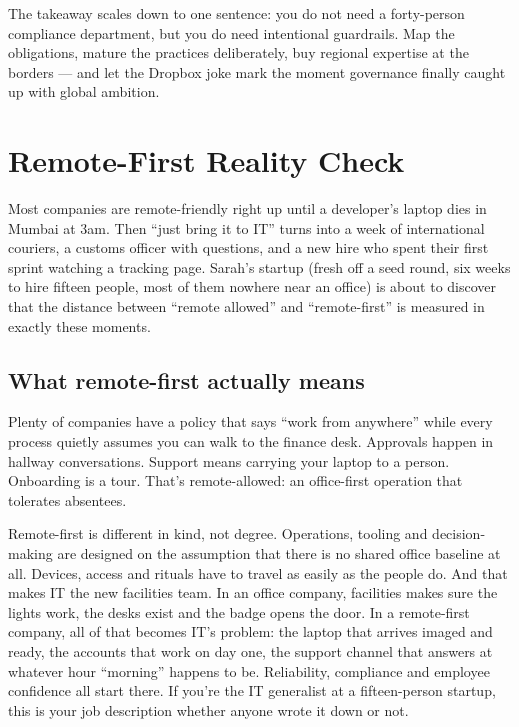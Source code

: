 The takeaway scales down to one sentence: you do not need a forty-person compliance department, but you do need intentional guardrails. Map the obligations, mature the practices deliberately, buy regional expertise at the borders — and let the Dropbox joke mark the moment governance finally caught up with global ambition.

\section{Remote-First Reality Check}
Most companies are remote-friendly right up until a developer's laptop dies in Mumbai at 3am. Then ``just bring it to IT'' turns into a week of international couriers, a customs officer with questions, and a new hire who spent their first sprint watching a tracking page. Sarah's startup (fresh off a seed round, six weeks to hire fifteen people, most of them nowhere near an office) is about to discover that the distance between ``remote allowed'' and ``remote-first'' is measured in exactly these moments.



\subsection{What remote-first actually means}


Plenty of companies have a policy that says ``work from anywhere'' while every process quietly assumes you can walk to the finance desk. Approvals happen in hallway conversations. Support means carrying your laptop to a person. Onboarding is a tour. That's remote-allowed: an office-first operation that tolerates absentees.


Remote-first is different in kind, not degree. Operations, tooling and decision-making are designed on the assumption that there is no shared office baseline at all. Devices, access and rituals have to travel as easily as the people do. And that makes IT the new facilities team. In an office company, facilities makes sure the lights work, the desks exist and the badge opens the door. In a remote-first company, all of that becomes IT's problem: the laptop that arrives imaged and ready, the accounts that work on day one, the support channel that answers at whatever hour ``morning'' happens to be. Reliability, compliance and employee confidence all start there. If you're the IT generalist at a fifteen-person startup, this is your job description whether anyone wrote it down or not.



